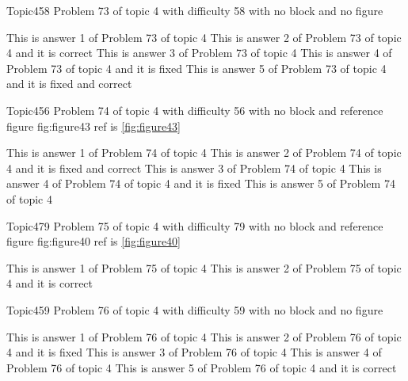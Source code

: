 \documentclass[master]{exam}
\begin{document}
\begin{problem}{Topic4}{58}
	Problem 73 of topic 4 with difficulty 58 with no block and no figure
	\begin{answers}
		\answer This is answer 1 of Problem 73 of topic 4 
		\answer[correct] This is answer 2 of Problem 73 of topic 4 and it is correct
		\answer This is answer 3 of Problem 73 of topic 4 
		\answer[fixed] This is answer 4 of Problem 73 of topic 4 and it is fixed
		 This is answer 5 of Problem 73 of topic 4 and it is fixed and correct
	\end{answers}
\end{problem}

\begin{problem}{Topic4}{56}
	Problem 74 of topic 4 with difficulty 56 with no block and reference figure fig:figure43 ref is \ref{fig:figure43}
	\begin{answers}
		\answer This is answer 1 of Problem 74 of topic 4 
		 This is answer 2 of Problem 74 of topic 4 and it is fixed and correct
		\answer This is answer 3 of Problem 74 of topic 4 
		\answer[fixed] This is answer 4 of Problem 74 of topic 4 and it is fixed
		\answer This is answer 5 of Problem 74 of topic 4 
	\end{answers}
\end{problem}

\begin{problem}{Topic4}{79}
	Problem 75 of topic 4 with difficulty 79 with no block and reference figure fig:figure40 ref is \ref{fig:figure40}
	\begin{answers}
		\answer This is answer 1 of Problem 75 of topic 4 
		\answer[correct] This is answer 2 of Problem 75 of topic 4 and it is correct
	\end{answers}
\end{problem}

\begin{problem}{Topic4}{59}
	Problem 76 of topic 4 with difficulty 59 with no block and no figure
	\begin{answers}
		\answer This is answer 1 of Problem 76 of topic 4 
		\answer[fixed] This is answer 2 of Problem 76 of topic 4 and it is fixed
		\answer This is answer 3 of Problem 76 of topic 4 
		\answer This is answer 4 of Problem 76 of topic 4 
		\answer[correct] This is answer 5 of Problem 76 of topic 4 and it is correct
	\end{answers}
\end{problem}
\end{document}
